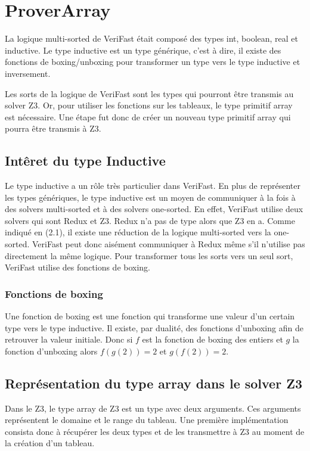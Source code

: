 \documentclass[9pt]{book}
\newcommand{\verifast}{VeriFast}
\begin{document}
	\section{ProverArray}
		La logique multi-sorted de \verifast{} \'etait compos\'e des types int, boolean, real et inductive. Le type inductive est un type g\'en\'erique, c'est \`a dire, il existe des fonctions de boxing/unboxing pour transformer un type vers le type inductive et inversement. \par
		Les sorts de la logique de \verifast{} sont les types qui pourront \^etre transmis au solver Z3. Or, pour utiliser les fonctions sur les tableaux, le type primitif array est n\'ecessaire. Une \'etape fut donc de cr\'eer un nouveau type primitif array qui pourra \^etre transmis \`a Z3.\par
		\subsection{Int\^eret du type Inductive}
			Le type inductive a un r\^ole tr\`es particulier dans \verifast{}. En plus de repr\'esenter les types g\'en\'eriques, le type inductive est un moyen de communiquer \`a la fois \`a des solvers multi-sorted et \`a des solvers one-sorted. En effet, \verifast{} utilise deux solvers qui sont Redux et Z3. Redux n'a pas de type alors que Z3 en a. Comme indiqu\'e en (2.1), il existe une r\'eduction de la logique multi-sorted vers la one-sorted. \verifast{} peut donc ais\'ement communiquer \`a Redux m\^eme s'il n'utilise pas directement la m\^eme logique. Pour transformer tous les sorts vers un seul sort, \verifast{} utilise des fonctions de boxing.
			\subsubsection{Fonctions de boxing}
			Une fonction de boxing est une fonction qui transforme une valeur d'un certain type vers le type inductive. Il existe, par dualit\'e, des fonctions d'unboxing afin de retrouver la valeur initiale. Donc si $f$ est la fonction de boxing des entiers et $g$ la fonction d'unboxing alors $f(g(2)) = 2$ et $g(f(2)) = 2$.
		\subsection{Repr\'esentation du type array dans le solver Z3}
			Dans le Z3, le type array de Z3 est un type avec deux arguments. Ces arguments repr\'esentent le domaine et le range du tableau. Une premi\`ere impl\'ementation consista donc \`a r\'ecup\'erer les deux types et de les transmettre \`a Z3 au moment de la cr\'eation d'un tableau.
\end{document}
